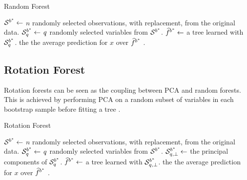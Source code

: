 \begin{algorithm}[H]
\caption{Random Forest}
\begin{algorithmic}
	\State $\mathcal{S}^{b^*} \gets$ $n$ randomly selected observations, with replacement, from the original data.
	\State $\mathcal{S}^{b^*}_q \gets$ $q$ randomly selected variables from $\mathcal{S}^{b^*}$.
    \State $\widehat{f}^{{b^*}} \gets$ a tree learned with  $\mathcal{S}^{b^*}_q$.
\EndFor
\State \Return the the average prediction for $x$ over $\widehat{f}^{{b^*}}$ .
\end{algorithmic}
\end{algorithm}





\subsection{Rotation Forest}
\label{sec:rotation_forest}

Rotation forests can be seen as the coupling between PCA and random forests. 
This is achieved by performing PCA on a random subset of variables in each bootstrap sample before fitting a tree \citep{rodriguez_rotation_2006}.

\begin{algorithm}[H]
\caption{Rotation Forest}
\begin{algorithmic}
	\State $\mathcal{S}^{b^*} \gets$ $n$ randomly selected observations, with replacement, from the original data.
	\State $\mathcal{S}^{b^*}_q \gets$ $q$ randomly selected variables from $\mathcal{S}^{b^*}$.
	\State $\mathcal{S}^{b^*}_{q,\perp} \gets$ the principal components of $\mathcal{S}^{b^*}_q$.
    \State $\widehat{f}^{{b^*}} \gets$ a tree learned with  $\mathcal{S}^{b^*}_{q,\perp}$.
\EndFor
\State \Return the the average prediction for $x$ over $\widehat{f}^{{b^*}}$ .
\end{algorithmic}
\end{algorithm}






